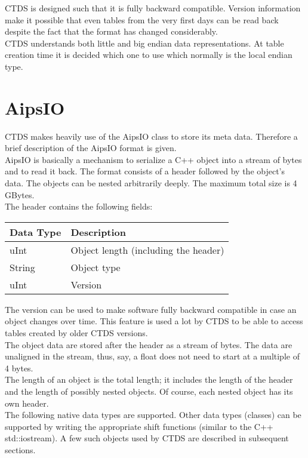 CTDS is designed such that it is fully backward compatible. Version
information make it possible that even
tables from the very first days can be read back despite the fact that
the format has changed considerably.
\\CTDS understands both little and big endian data
representations. At table creation time it is decided which one to use
which normally is the local endian type.


\section{\label{CTDS:AIPSIO}AipsIO}
CTDS makes heavily use of the AipsIO class to store its meta
data. Therefore a brief description of the AipsIO format is given.
\\AipsIO is basically a mechanism to serialize a C++ object into a
stream of bytes and to read it back. The format consists of a header followed
by the object's data. The objects can be nested arbitrarily deeply. The maximum
total size is 4 GBytes.
\\The header contains the following fields:

\vspace{0.15in}
\begin{tabular}{|l|l|} \hline
  Data Type & Description \\ \hline\hline
  uInt & Object length (including the header) \\
  String & Object type \\
  uInt & Version \\
  \hline
\end{tabular}
\vspace{0.15in}

The version can be used to make software fully backward compatible
in case an object changes over time. This feature is used a lot by
CTDS to be able to access tables created by older CTDS versions.
\\The object data are stored after the header as a stream of
bytes. The data are unaligned in the stream, thus, say, a float
does not need to start at a multiple of 4 bytes.
\\The length of an object is the total length; it includes the length
of the header and the length of possibly nested objects. Of course, each nested
object has its own header.
\\The following native data types are supported. Other data types
(classes) can be supported by writing the appropriate shift functions
(similar to the C++ std::iostream). A few such objects used by CTDS
are described in subsequent sections.

